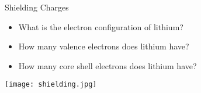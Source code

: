 \documentclass[notes=onlyslideswithnotes,notes=hide]{beamer}
\begin{document}
\begin{frame}[allowframebreaks]{Shielding Charges}
	\begin{itemize}
		\item What is the electron configuration of lithium?
		\item How many \alert{valence} electrons does lithium have?
		\item How many \alert{core shell} electrons does lithium have?
	\end{itemize}

	\begin{center}
		\texttt{[image: shielding.jpg]}
	\end{center}
\end{frame}

\end{document}
